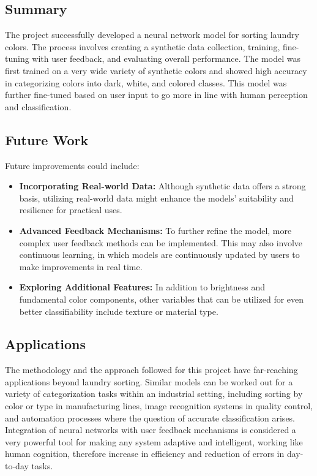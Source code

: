 \documentclass{article}
\begin{document}
\subsection{Summary}
The project successfully developed a neural network model for sorting laundry colors. The process involves creating a synthetic data collection, training, fine-tuning with user feedback, and evaluating overall performance. The model was first trained on a very wide variety of synthetic colors and showed high accuracy in categorizing colors into dark, white, and colored classes. This model was further fine-tuned based on user input to go more in line with human perception and classification.
\subsection{Future Work}
Future improvements could include:
\begin{itemize}
  \item \textbf{Incorporating Real-world Data:} Although synthetic data offers a strong basis, utilizing real-world data might enhance the models' suitability and resilience for practical uses.
  \item \textbf{Advanced Feedback Mechanisms:} To further refine the model, more complex user feedback methods can be implemented. This may also involve continuous learning, in which models are continuously updated by users to make improvements in real time.
  \item \textbf{Exploring Additional Features:}  In addition to brightness and fundamental color components, other variables that can be utilized for even better classifiability include texture or material type.
 \end{itemize}
\subsection{Applications}
The methodology and the approach followed for this project have far-reaching applications beyond laundry sorting. Similar models can be worked out for a variety of categorization tasks within an industrial setting, including sorting by color or type in manufacturing lines, image recognition systems in quality control, and automation processes where the question of accurate classification arises. Integration of neural networks with user feedback mechanisms is considered a very powerful tool for making any system adaptive and intelligent, working like human cognition, therefore increase in efficiency and reduction of errors in day-to-day tasks.
\end{document}
